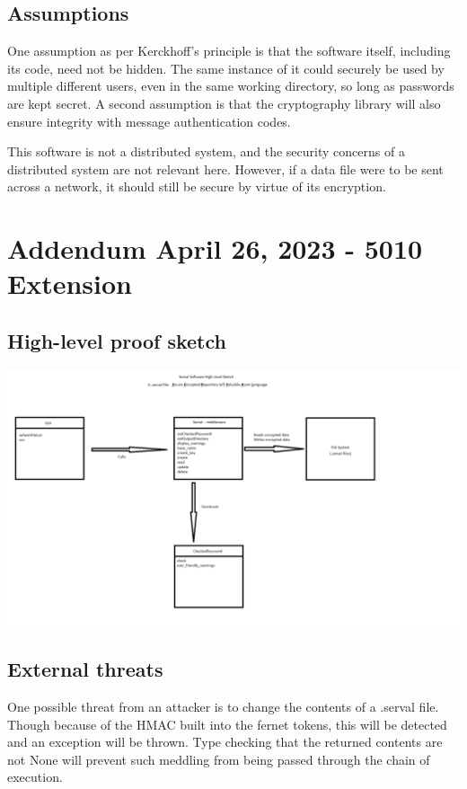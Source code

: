\documentclass[12pt, letterpaper]{article}
\begin{document}
\subsection{Assumptions}
One assumption as per Kerckhoff's principle is that the software itself, including its code, need not be hidden. The same instance of it could securely be used by multiple different users, even in the same working directory, so long as passwords are kept secret. A second assumption is that the cryptography library will also ensure integrity with message authentication codes.

This software is not a distributed system, and the security concerns of a distributed system are not relevant here. However, if a data file were to be sent across a network, it should still be secure by virtue of its encryption.

\section{Addendum April 26, 2023 - 5010 Extension}

\subsection{High-level proof sketch}

\includegraphics[scale=0.4]{High_Level_Proof_Sketch.png}

\subsection{External threats}

One possible threat from an attacker is to change the contents of a .serval file. Though because of the HMAC built into the fernet tokens, this will be detected and an exception will be thrown. Type checking that the returned contents are not None will prevent such meddling from being passed through the chain of execution.
\end{document}
